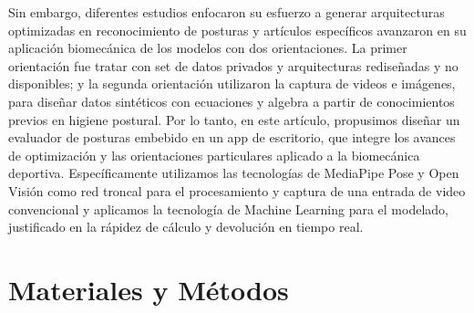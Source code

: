 \documentclass[twoside,11pt]{article}
\begin{document}
Sin embargo, diferentes estudios enfocaron su esfuerzo a generar 
arquitecturas optimizadas en reconocimiento de posturas y artículos específicos avanzaron 
en su aplicación biomecánica de los modelos con dos orientaciones. La primer orientación fue tratar 
con set de datos privados y arquitecturas rediseñadas y no disponibles; 
y la segunda orientación utilizaron la captura de videos e imágenes, para diseñar 
datos sintéticos con ecuaciones y algebra a partir de conocimientos previos
 en higiene postural.
Por lo tanto, en este artículo, propusimos diseñar un evaluador de posturas
embebido en un app de escritorio, que integre los avances de optimización y
 las orientaciones particulares aplicado a la biomecánica deportiva. 
Específicamente utilizamos las tecnologías de MediaPipe Pose y Open Visión como red
troncal para el procesamiento y captura de una entrada de video convencional y 
aplicamos la tecnología de Machine Learning para el modelado,
justificado en la rápidez de cálculo y devolución en tiempo real.




\section{Materiales y Métodos}
\end{document}
